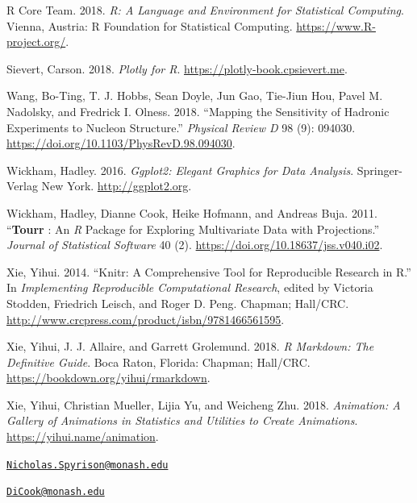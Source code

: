 \leavevmode\hypertarget{ref-r_core_team_r:_2018}{}%
R Core Team. 2018. \emph{R: A Language and Environment for Statistical
Computing}. Vienna, Austria: R Foundation for Statistical Computing.
\url{https://www.R-project.org/}.

\leavevmode\hypertarget{ref-sievert_plotly_2018}{}%
Sievert, Carson. 2018. \emph{Plotly for R}.
\url{https://plotly-book.cpsievert.me}.

\leavevmode\hypertarget{ref-wang_mapping_2018}{}%
Wang, Bo-Ting, T. J. Hobbs, Sean Doyle, Jun Gao, Tie-Jiun Hou, Pavel M.
Nadolsky, and Fredrick I. Olness. 2018. ``Mapping the Sensitivity of
Hadronic Experiments to Nucleon Structure.'' \emph{Physical Review D} 98
(9): 094030. \url{https://doi.org/10.1103/PhysRevD.98.094030}.

\leavevmode\hypertarget{ref-wickham_ggplot2:_2016}{}%
Wickham, Hadley. 2016. \emph{Ggplot2: Elegant Graphics for Data
Analysis}. Springer-Verlag New York. \url{http://ggplot2.org}.

\leavevmode\hypertarget{ref-wickham_tourr_2011}{}%
Wickham, Hadley, Dianne Cook, Heike Hofmann, and Andreas Buja. 2011.
``\textbf{Tourr} : An \emph{R} Package for Exploring Multivariate Data
with Projections.'' \emph{Journal of Statistical Software} 40 (2).
\url{https://doi.org/10.18637/jss.v040.i02}.

\leavevmode\hypertarget{ref-stodden_knitr:_2014}{}%
Xie, Yihui. 2014. ``Knitr: A Comprehensive Tool for Reproducible
Research in R.'' In \emph{Implementing Reproducible Computational
Research}, edited by Victoria Stodden, Friedrich Leisch, and Roger D.
Peng. Chapman; Hall/CRC.
\url{http://www.crcpress.com/product/isbn/9781466561595}.

\leavevmode\hypertarget{ref-xie_r_2018}{}%
Xie, Yihui, J. J. Allaire, and Garrett Grolemund. 2018. \emph{R
Markdown: The Definitive Guide}. Boca Raton, Florida: Chapman; Hall/CRC.
\url{https://bookdown.org/yihui/rmarkdown}.

\leavevmode\hypertarget{ref-xie_animation:_2018}{}%
Xie, Yihui, Christian Mueller, Lijia Yu, and Weicheng Zhu. 2018.
\emph{Animation: A Gallery of Animations in Statistics and Utilities to
Create Animations}. \url{https://yihui.name/animation}.



\address{%
Nicholas Spyrison\\
Monash University\\
Faculty of Information Technology\\
}
\href{mailto:Nicholas.Spyrison@monash.edu}{\nolinkurl{Nicholas.Spyrison@monash.edu}}

\address{%
Dianne Cook\\
Monash University\\
Department of Econometrics and Business Statistics\\
}
\href{mailto:DiCook@monash.edu}{\nolinkurl{DiCook@monash.edu}}

